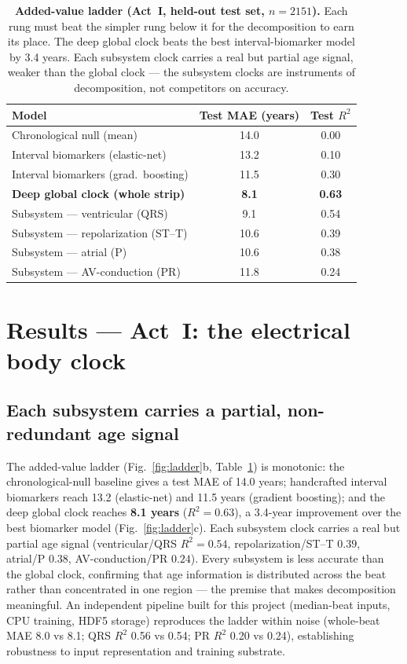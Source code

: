 \documentclass[11pt]{article}
\begin{document}
\begin{table}[t]
\centering
\caption{\textbf{Added-value ladder (Act~I, held-out test set, $n=\num{2151}$).} Each rung must
beat the simpler rung below it for the decomposition to earn its place. The deep global clock
beats the best interval-biomarker model by 3.4 years. Each subsystem clock carries a real but
partial age signal, weaker than the global clock --- the subsystem clocks are instruments of
decomposition, not competitors on accuracy.}
\label{tab:ladder}
\begin{tabular}{lcc}
\toprule
Model & Test MAE (years) & Test $R^2$ \\
\midrule
Chronological null (mean)        & 14.0 & 0.00 \\
Interval biomarkers (elastic-net) & 13.2 & 0.10 \\
Interval biomarkers (grad.\ boosting) & 11.5 & 0.30 \\
\textbf{Deep global clock (whole strip)} & \textbf{8.1} & \textbf{0.63} \\
\midrule
Subsystem --- ventricular (QRS)   & 9.1 & 0.54 \\
Subsystem --- repolarization (ST--T) & 10.6 & 0.39 \\
Subsystem --- atrial (P)           & 10.6 & 0.38 \\
Subsystem --- AV-conduction (PR)   & 11.8 & 0.24 \\
\bottomrule
\end{tabular}
\end{table}

\section{Results --- Act~I: the electrical body clock}

\subsection{Each subsystem carries a partial, non-redundant age signal}

The added-value ladder (Fig.~\ref{fig:ladder}b, Table~\ref{tab:ladder}) is monotonic: the
chronological-null baseline gives a test MAE of 14.0 years; handcrafted interval biomarkers
reach 13.2 (elastic-net) and 11.5 years (gradient boosting); and the deep global clock reaches
\textbf{8.1 years} ($R^2=0.63$), a 3.4-year improvement over the best biomarker model
(Fig.~\ref{fig:ladder}c). Each subsystem clock carries a real but partial age signal
(ventricular/QRS $R^2=0.54$, repolarization/ST--T $0.39$, atrial/P $0.38$, AV-conduction/PR
$0.24$). Every subsystem is less accurate than the global clock, confirming that age
information is distributed across the beat rather than concentrated in one region --- the
premise that makes decomposition meaningful. An independent pipeline built for this project
(median-beat inputs, CPU training, HDF5 storage) reproduces the ladder within noise (whole-beat
MAE 8.0 vs 8.1; QRS $R^2$ 0.56 vs 0.54; PR $R^2$ 0.20 vs 0.24), establishing robustness to
input representation and training substrate.
\end{document}
